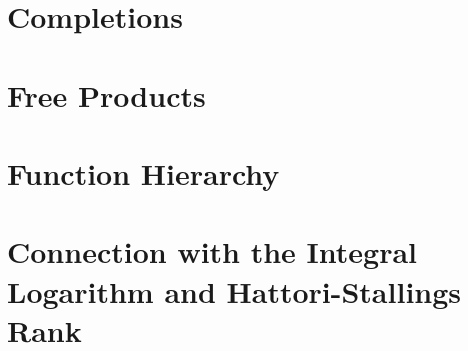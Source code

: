 \documentclass{report}
\begin{document}
\chapter{Completions}


\chapter{Free Products}


\chapter{Function Hierarchy}


\chapter{Connection with the Integral Logarithm and Hattori-Stallings Rank}


\end{document}
